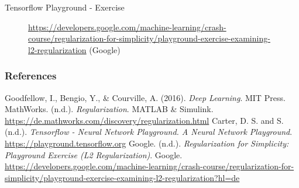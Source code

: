 \begin{frame}{Tensorflow Playground - Exercise}
  \begin{figure}
    \centering
    \caption{\url{https://developers.google.com/machine-learning/crash-course/regularization-for-simplicity/playground-exercise-examining-l2-regularization} (Google)}
  \end{figure}
\end{frame}

\begin{vbframe}
\frametitle{References}
\footnotesize{
\begin{thebibliography}{99}
Goodfellow, I., Bengio, Y., \& Courville, A. (2016). \textit{Deep Learning}. MIT Press. 
MathWorks. (n.d.). \textit{Regularization}. MATLAB \& Simulink. \url{https://de.mathworks.com/discovery/regularization.html}
Carter, D. S. and S. (n.d.). \textit{Tensorflow - Neural Network Playground. A Neural Network Playground}. \url{https://playground.tensorflow.org} 
 Google. (n.d.). \textit{Regularization for Simplicity: Playground Exercise (L2 Regularization)}. Google. \url{https://developers.google.com/machine-learning/crash-course/regularization-for-simplicity/playground-exercise-examining-l2-regularization?hl=de} 
\end{thebibliography}
}
\end{vbframe}

\endlecture
